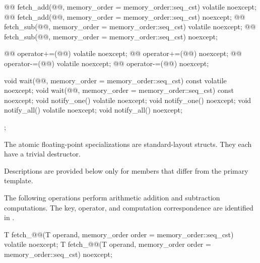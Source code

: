 \begin{codeblock}
{{    @@ fetch_add(@@,
                             memory_order = memory_order::seq_cst) volatile noexcept;
    @@ fetch_add(@@,
                             memory_order = memory_order::seq_cst) noexcept;
    @@ fetch_sub(@@,
                             memory_order = memory_order::seq_cst) volatile noexcept;
    @@ fetch_sub(@@,
                             memory_order = memory_order::seq_cst) noexcept;

    @@ operator+=(@@) volatile noexcept;
    @@ operator+=(@@) noexcept;
    @@ operator-=(@@) volatile noexcept;
    @@ operator-=(@@) noexcept;

    void wait(@@, memory_order = memory_order::seq_cst) const volatile noexcept;
    void wait(@@, memory_order = memory_order::seq_cst) const noexcept;
    void notify_one() volatile noexcept;
    void notify_one() noexcept;
    void notify_all() volatile noexcept;
    void notify_all() noexcept;
  };
}
\end{codeblock}

\pnum
The atomic floating-point specializations
are standard-layout structs.
They each have
a trivial destructor.

\pnum
Descriptions are provided below only for members that differ from the primary template.

\pnum
The following operations perform arithmetic addition and subtraction computations.
The key, operator, and computation correspondence are identified in
.

%
%
%
%
%
%
\begin{itemdecl}
T fetch_@@(T operand, memory_order order = memory_order::seq_cst) volatile noexcept;
T fetch_@@(T operand, memory_order order = memory_order::seq_cst) noexcept;
\end{itemdecl}

